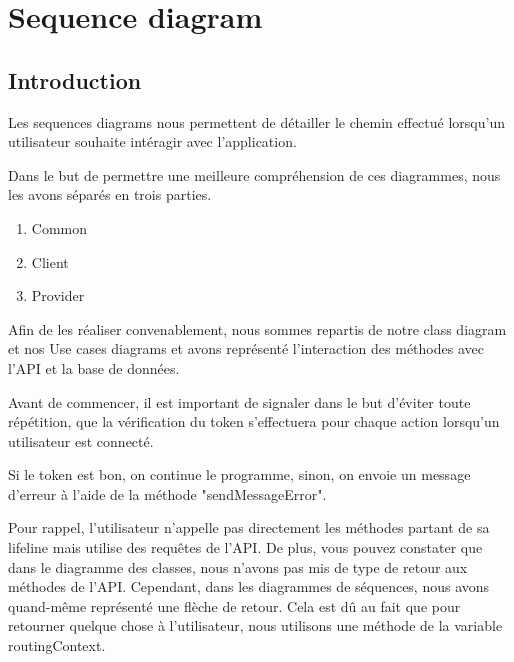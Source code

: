 \section{Sequence diagram}

\subsection{Introduction}

\begin{flushleft}
Les sequences diagrams nous permettent de détailler le chemin effectué lorsqu'un utilisateur souhaite intéragir avec l'application.
\end{flushleft}

\begin{flushleft}
Dans le but de permettre une meilleure compréhension de ces diagrammes, nous les avons séparés en trois parties.
\begin{enumerate}
\item Common
\item Client
\item Provider
\end{enumerate}
\end{flushleft}

\begin{flushleft}
Afin de les réaliser convenablement, nous sommes repartis de notre class diagram et nos Use cases diagrams et avons représenté l'interaction des méthodes avec l'API et la base de données.
\end{flushleft}

\begin{flushleft}
Avant de commencer, il est important de signaler dans le but d'éviter toute répétition, que la vérification du token s'effectuera pour chaque action lorsqu'un utilisateur est connecté.
\end{flushleft}

\begin{flushleft}
Si le token est bon, on continue le programme, sinon, on envoie un message d'erreur à l'aide de la méthode "sendMessageError".
\end{flushleft}

\begin{flushleft}
Pour rappel, l'utilisateur n'appelle pas directement les méthodes partant de sa lifeline mais utilise des requêtes de l'API. De plus, vous pouvez constater que dans le diagramme des classes, nous n'avons pas mis de type de retour aux méthodes de l'API. Cependant, dans les diagrammes de séquences, nous avons quand-même représenté une flèche de retour. Cela est dû au fait que pour retourner quelque chose à l'utilisateur, nous utilisons une méthode de la variable routingContext.
\end{flushleft}


